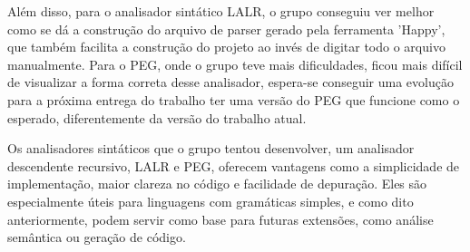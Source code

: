 \documentclass{article}
\begin{document}
Além disso, para o analisador sintático LALR, o grupo conseguiu ver melhor como se dá a construção do arquivo de parser gerado pela ferramenta 'Happy', que também facilita a construção do projeto ao invés de digitar todo o arquivo manualmente. Para o PEG, onde o grupo teve mais dificuldades, ficou mais difícil de visualizar a forma correta desse analisador, espera-se conseguir uma evolução para a próxima entrega do trabalho ter uma versão do PEG que funcione como o esperado, diferentemente da versão do trabalho atual.

Os analisadores sintáticos que o grupo tentou desenvolver, um analisador descendente recursivo, LALR e PEG, oferecem vantagens como a simplicidade de implementação, maior clareza no código e facilidade de depuração. Eles são especialmente úteis para linguagens com gramáticas simples, e como dito anteriormente, podem servir como base para futuras extensões, como análise semântica ou geração de código.
\end{document}
